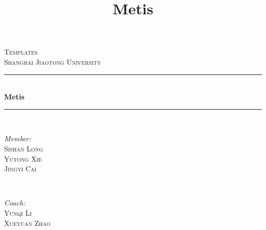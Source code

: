 \documentclass[landscape,a4paper]{article}
\title{Metis}
\begin{document}
\scriptsize
\begin{titlepage}

\newcommand{\HRule}{\rule{\linewidth}{0.5mm}}
\center
\textsc{\LARGE Templates}\\[1.5cm] 
\textsc{\Large Shanghai Jiaotong University}\\[0.5cm]
\HRule \\[0.4cm]
{ \huge \bfseries Metis}\\[0.4cm] 
\HRule \\[1.5cm]

\begin{minipage}{0.4\textwidth}
\begin{flushleft} \large
\emph{Member:}\\
 \textsc{Sishan Long \\ Yutong Xie \\ Jingyi Cai}
\end{flushleft}
\end{minipage}
~
\begin{minipage}{0.4\textwidth}
\begin{flushright} \large
\emph{Coach:} \\
\textsc{Yunqi Li \\ Xueyuan Zhao}
\end{flushright}
\end{minipage}\\[4cm]



\vfill

\end{titlepage}
	
	
	
\end{document}
